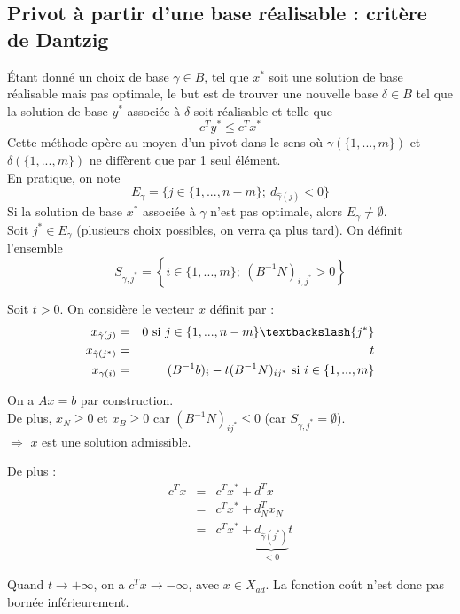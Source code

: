 \subsection{Privot à partir d'une base réalisable : critère de Dantzig}
Étant donné un choix de base $\gamma\in B$, tel que $x^*$ soit une solution de base réalisable mais pas optimale, le but est de trouver une nouvelle base $\delta\in B$ tel que la solution de base $y^*$ associée à $\delta$ soit réalisable et telle que 
\[c^Ty^*\leq c^Tx^*\]
Cette méthode opère au moyen d'un pivot dans le sens où $\gamma(\{1,...,m\})$ et $\delta(\{1,...,m\})$ ne diffèrent que par 1 seul élément.\\
En pratique, on note 
	\[E_{\gamma}=\{j\in\{1,...,n-m\};\ d_{\hat{\gamma}(j)}<0\}\]
Si la solution de base $x^*$ associée à $\gamma$ n'est pas optimale, alors $E_{\gamma}\neq \emptyset$.\\
Soit $j^*\in E_{\gamma}$ (plusieurs choix possibles, on verra ça plus tard). On définit l'ensemble 
	\[S_{\gamma,j^*}=\left\{i\in\{1,...,m\};\ (B^{-1}N)_{i,j^*}>0 \right\}\]


\begin{dem}
	Soit $t>0$. On considère le vecteur $x$ définit par :
\begin{eqnarray*}
	x_{\hat{\gamma}(j)}&=&0 \text{ si } j\in\{1,...,n-m\}\textbackslash \{j^*\}\\
	x_{\hat{\gamma}(j^*)}&=&t\\
	x_{\gamma(i)}&=&(B^{-1}b)_i-t(B^{-1}N)_{ij^*} \text{ si } i\in\{1,...,m\}
\end{eqnarray*}

On a $Ax=b$ par construction.\\
De plus, $x_N\geq 0$ et $x_B\geq 0$ car $(B^{-1}N)_{ij^*}\leq 0$ (car $S_{\gamma,j^*}=\emptyset$).\\
$\Rightarrow$ $x$ est une solution admissible.

\bigskip
De plus :
\begin{eqnarray*}
	c^Tx&=&c^Tx^*+d^Tx\\
		&=&c^Tx^*+d_N^Tx_N\\
		&=&c^Tx^*+\underbrace{d_{\hat{\gamma}(j^*)}}_{<0}t
\end{eqnarray*}

Quand $t\to +\infty$, on a $c^Tx\to -\infty$, avec $x\in X_{ad}$. La fonction coût n'est donc pas bornée inférieurement.
\end{dem}

